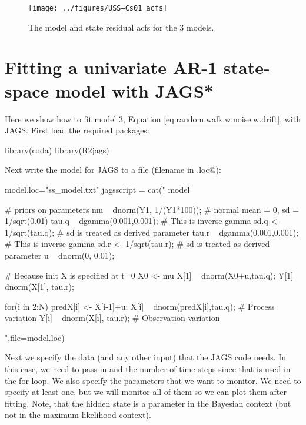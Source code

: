 \begin{figure}[htp]
\begin{center}
\texttt{[image: ../figures/USS--Cs01\_acfs]}
\end{center}
\caption{The model and state residual acfs for the 3 models.}
\label{fig:acfs}
\end{figure}

\clearpage

\section{Fitting a univariate AR-1 state-space model with JAGS*}

Here we show how to fit model 3, Equation \ref{eq:random.walk.w.noise.w.drift}, with JAGS.
First load the required packages:
\begin{Schunk}
\begin{Sinput}
 library(coda)
 library(R2jags)
\end{Sinput}
\end{Schunk}
Next write the model for JAGS to a file (filename in \verb@model.loc@):
\begin{Schunk}
\begin{Sinput}
 model.loc="ss_model.txt"
 jagsscript = cat("
    model {  
    # priors on parameters
    mu ~ dnorm(Y1, 1/(Y1*100)); # normal mean = 0, sd = 1/sqrt(0.01)
    tau.q ~ dgamma(0.001,0.001); # This is inverse gamma
    sd.q <- 1/sqrt(tau.q); # sd is treated as derived parameter
    tau.r ~ dgamma(0.001,0.001); # This is inverse gamma
    sd.r <- 1/sqrt(tau.r); # sd is treated as derived parameter
    u ~ dnorm(0, 0.01);
     
    # Because init X is specified at t=0
    X0 <- mu
    X[1] ~ dnorm(X0+u,tau.q);
    Y[1] ~ dnorm(X[1], tau.r);
  
    for(i in 2:N) {
    predX[i] <- X[i-1]+u; 
    X[i] ~ dnorm(predX[i],tau.q); # Process variation
    Y[i] ~ dnorm(X[i], tau.r); # Observation variation
    }
    }                  
    ",file=model.loc)
\end{Sinput}
\end{Schunk}
Next we specify the data (and any other input) that the JAGS code needs.  In this case, we need to pass in \verb@dat@ and the number of time steps since that is used in the for loop.  We also specify the parameters that we want to monitor.  We need to specify at least one, but we will monitor all of them so we can plot them after fitting.  Note, that the hidden state is a parameter in the Bayesian context (but not in the maximum likelihood context).  

